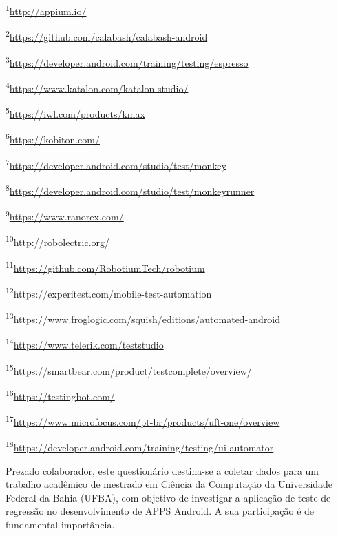 \vspace{0.5cm}
\footnotesize
{
\textsuperscript{1}\url{http://appium.io/}

\textsuperscript{2}\url{https://github.com/calabash/calabash-android}

\textsuperscript{3}\url{https://developer.android.com/training/testing/espresso}

\textsuperscript{4}\url{https://www.katalon.com/katalon-studio/}

\textsuperscript{5}\url{https://iwl.com/products/kmax}

\textsuperscript{6}\url{https://kobiton.com/}

\textsuperscript{7}\url{https://developer.android.com/studio/test/monkey}

\textsuperscript{8}\url{https://developer.android.com/studio/test/monkeyrunner}

\textsuperscript{9}\url{https://www.ranorex.com/}

\textsuperscript{10}\url{http://robolectric.org/}

\textsuperscript{11}\url{https://github.com/RobotiumTech/robotium}

\textsuperscript{12}\url{https://experitest.com/mobile-test-automation}

\textsuperscript{13}\url{https://www.froglogic.com/squish/editions/automated-android}

\textsuperscript{14}\url{https://www.telerik.com/teststudio}

\textsuperscript{15}\url{https://smartbear.com/product/testcomplete/overview/}

\textsuperscript{16}\url{https://testingbot.com/}

\textsuperscript{17}\url{https://www.microfocus.com/pt-br/products/uft-one/overview}

\textsuperscript{18}\url{https://developer.android.com/training/testing/ui-automator}

}





\label{sec:formulariopesquisa}


Prezado colaborador, este questionário destina-se a coletar dados para um trabalho acadêmico de mestrado em Ciência da Computação da Universidade Federal da Bahia (UFBA), com objetivo de investigar a aplicação de teste de regressão no desenvolvimento de \ac{APPS} Android. A sua participação é de fundamental importância.


